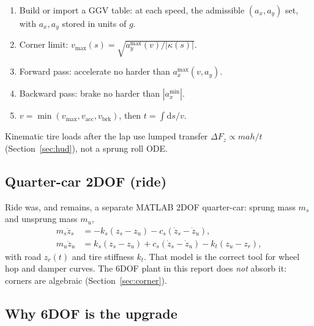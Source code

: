\documentclass[11pt,letterpaper]{article}
\begin{document}
\begin{enumerate}[leftmargin=1.6em]
  \item Build or import a GGV table: at each speed, the admissible
        $(a_x,a_y)$ set, with $a_x,a_y$ stored in units of $g$.
  \item Corner limit: $v_{\max}(s)=\sqrt{a_y^{\max}(v)/|\kappa(s)|}$.
  \item Forward pass: accelerate no harder than $a_x^{\max}(v,a_y)$.
  \item Backward pass: brake no harder than $|a_x^{\min}|$.
  \item $v=\min(v_{\max},v_{\mathrm{acc}},v_{\mathrm{brk}})$, then
        $t=\int \mathrm{d}s/v$.
\end{enumerate}

Kinematic tire loads after the lap use lumped transfer
$\Delta F_z \propto m a h / t$ (Section~\ref{sec:hud}), not a sprung
roll ODE.

\subsection{Quarter-car 2DOF (ride)}
\label{sec:quarter}

Ride was, and remains, a separate MATLAB 2DOF quarter-car: sprung mass
$m_s$ and unsprung mass $m_u$,
\begin{align}
  m_s\ddot z_s &= -k_s(z_s-z_u)-c_s(\dot z_s-\dot z_u),\\
  m_u\ddot z_u &= k_s(z_s-z_u)+c_s(\dot z_s-\dot z_u)
                 -k_t(z_u-z_r),
\end{align}
with road $z_r(t)$ and tire stiffness $k_t$. That model is the correct
tool for wheel hop and damper curves. The 6DOF plant in this report
does \emph{not} absorb it: corners are algebraic (Section~\ref{sec:corner}).

\subsection{Why 6DOF is the upgrade}
\label{sec:upgrade}
\end{document}
